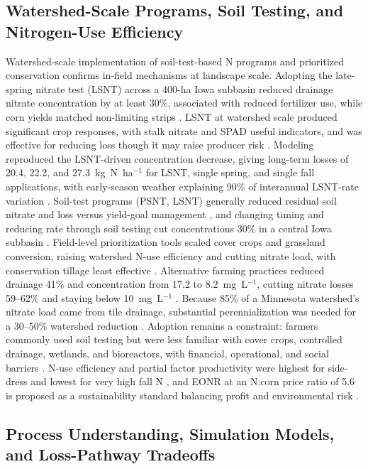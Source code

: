 \subsection{Watershed-Scale Programs, Soil Testing, and Nitrogen-Use Efficiency}

Watershed-scale implementation of soil-test-based N programs and prioritized conservation confirms in-field mechanisms at landscape scale. Adopting the late-spring nitrate test (LSNT) across a 400-ha Iowa subbasin reduced drainage nitrate concentration by at least 30\%, associated with reduced fertilizer use, while corn yields matched non-limiting strips \parencite{Jaynes2004}. LSNT at watershed scale produced significant crop responses, with stalk nitrate and SPAD useful indicators, and was effective for reducing loss though it may raise producer risk \parencite{Karlen2005}. Modeling reproduced the LSNT-driven concentration decrease, giving long-term losses of 20.4, 22.2, and 27.3~kg~N~ha$^{-1}$ for LSNT, single spring, and single fall applications, with early-season weather explaining 90\% of interannual LSNT-rate variation \parencite{Malone2010}. Soil-test programs (PSNT, LSNT) generally reduced residual soil nitrate and loss versus yield-goal management \parencite{Dinnes2002}, and changing timing and reducing rate through soil testing cut concentrations 30\% in a central Iowa subbasin \parencite{Ritter2015}. Field-level prioritization tools scaled cover crops and grassland conversion, raising watershed N-use efficiency and cutting nitrate load, with conservation tillage least effective \parencite{Makhtoumi2025}. Alternative farming practices reduced drainage 41\% and concentration from 17.2 to 8.2~mg~L$^{-1}$, cutting nitrate losses 59--62\% and staying below 10~mg~L$^{-1}$ \parencite{Oquist2007}. Because 85\% of a Minnesota watershed's nitrate load came from tile drainage, substantial perennialization was needed for a 30--50\% watershed reduction \parencite{Wilson2023}. Adoption remains a constraint: farmers commonly used soil testing but were less familiar with cover crops, controlled drainage, wetlands, and bioreactors, with financial, operational, and social barriers \parencite{David2015}. N-use efficiency and partial factor productivity were highest for side-dress and lowest for very high fall N \parencite{Jaynes2015}, and EONR at an N:corn price ratio of 5.6 is proposed as a sustainability standard balancing profit and environmental risk \parencite{Bandura2025}.

\subsection{Process Understanding, Simulation Models, and Loss-Pathway Tradeoffs}

